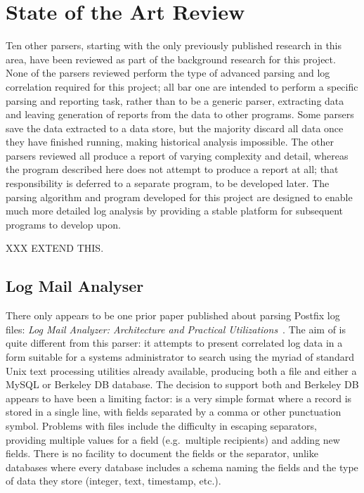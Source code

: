 \section{State of the Art Review}

\label{other-parsers}

\label{state of the art review}


Ten other parsers, starting with the only previously published research in
this area, have been reviewed as part of the background research for this
project.  None of the parsers reviewed perform the type of advanced parsing
and log correlation required for this project; all bar one are intended to
perform a specific parsing and reporting task, rather than to be a generic
parser, extracting data and leaving generation of reports from the data to
other programs.  Some parsers save the data extracted to a data store, but
the majority discard all data once they have finished running, making
historical analysis impossible.  The other parsers reviewed all produce a
report of varying complexity and detail, whereas the program described here
does not attempt to produce a report at all; that responsibility is
deferred to a separate program, to be developed later.  The parsing
algorithm and program developed for this project are designed to enable
much more detailed log analysis by providing a stable platform for
subsequent programs to develop upon.

XXX EXTEND THIS\@.

\subsection{Log Mail Analyser}

\label{prior art}

There only appears to be one prior paper published about parsing Postfix
log files: \textit{Log Mail Analyzer: Architecture and Practical
Utilizations\/}~\cite{log-mail-analyser}.  The aim of \LMA{} is quite
different from this parser: it attempts to present correlated log data in a
form suitable for a systems administrator to search using the myriad of
standard Unix text processing utilities already available, producing both a
\CSV{} file and either a MySQL or Berkeley DB database.  The decision to
support both \CSV{} and Berkeley DB appears to have been a limiting factor:
\CSV{} is a very simple format where a record is stored in a single line,
with fields separated by a comma or other punctuation symbol.  Problems
with \CSV{} files include the difficulty in escaping separators, providing
multiple values for a field (e.g.\ multiple recipients) and adding new
fields.  There is no facility to document the fields or the separator,
unlike \SQL{} databases where every database includes a schema naming the
fields and the type of data they store (integer, text, timestamp, etc.).

